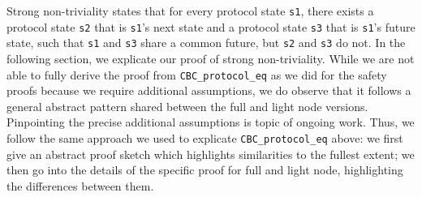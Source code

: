 \documentclass[runningheads]{llncs}
\begin{document}
Strong non-triviality states that for every protocol state \verb|s1|, there exists a protocol state \verb|s2| that is \verb|s1|'s next state and a protocol state \verb|s3| that is \verb|s1|'s future state, such that \verb|s1| and \verb|s3| share a common future, but \verb|s2| and \verb|s3| do not. 
In the following section, we explicate our proof of strong non-triviality. While we are not able to fully derive the proof from \verb|CBC_protocol_eq| as we did for the safety proofs because we require additional assumptions, we do observe that it follows a general abstract pattern shared between the full and light node versions. Pinpointing the precise additional assumptions is topic of ongoing work. Thus, we follow the same approach we used to explicate \verb|CBC_protocol_eq| above: we first give an abstract proof sketch which highlights similarities to the fullest extent; we then go into the details of the specific proof for full and light node, highlighting the differences between them. 
\end{document}
